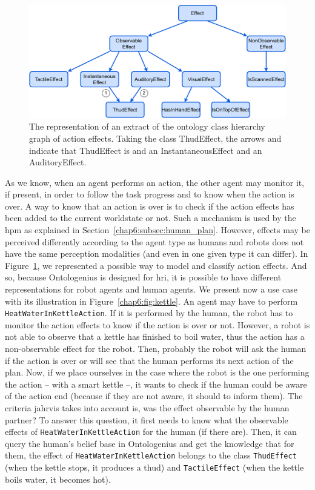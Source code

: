 \documentclass[a4paper,11pt,twoside]{StyleThese}
\begin{document}
\begin{figure}[!ht]
	\includegraphics[width=\linewidth]{figures/chapter2/class_effects.pdf}
	\caption{The representation of an extract of the ontology class hierarchy graph of action effects. Taking the class ThudEffect, the arrows  and  indicate that ThudEffect is and an InstantaneousEffect and an AuditoryEffect.}
	\label{chap6:fig:class_effects}
\end{figure}

As we know, when an agent performs an action, the other agent may monitor it, if present, in order to follow the task progress and to know when the action is over. A way to know that an action is over is to check if the action effects has been added to the current worldstate or not. Such a mechanism is used by the \acrlong{hpm} as explained in Section~\ref{chap6:subsec:human_plan}. However, effects may be perceived differently according to the agent type as humans and robots does not have the same perception modalities (and even in one given type it can differ). In Figure~\ref{chap6:fig:class_effects}, we represented a possible way to model and classify action effects. And so, because Ontologenius is designed for \acrshort{hri}, it is possible to have different representations for robot agents and human agents. We present now a use case with its illustration in Figure~\ref{chap6:fig:kettle}. An agent may have to perform \verb'HeatWaterInKettleAction'. If it is performed by the human, the robot has to monitor the action effects to know if the action is over or not. However, a robot is not able to observe that a kettle has finished to boil water, thus the action has a non-observable effect for the robot. Then, probably the robot will ask the human if the action is over or will see that the human performs its next action of the plan. Now, if we place ourselves in the case where the robot is the one performing the action -- with a smart kettle --, it wants to check if the human could be aware of the action end (because if they are not aware, it should to inform them). The criteria \acrshort{jahrvis} takes into account is, was the effect observable by the human partner? To answer this question, it first needs to know what the observable effects of \verb'HeatWaterInKettleAction' for the human (if there are). Then, it can query the human's belief base in Ontologenius and get the knowledge that for them, the effect of \verb'HeatWaterInKettleAction' belongs to the class \verb'ThudEffect' (when the kettle stops, it produces a thud) and \verb'TactileEffect' (when the kettle boils water, it becomes hot).
	
\end{document}
